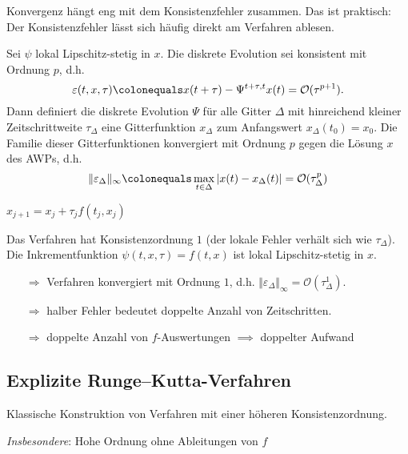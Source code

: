 Konvergenz hängt eng mit dem Konsistenzfehler zusammen. Das ist praktisch: Der Konsistenzfehler lässt sich häufig direkt am Verfahren ablesen.

\begin{satz}
	Sei $\psi$ lokal Lipschitz-stetig in $x$. Die diskrete Evolution sei konsistent mit Ordnung $p$, d.h.
	\begin{equation*}
		\varepsilon(t,x,\tau) \colonequals x(t+\tau)-\Psi^{t+\tau,t} x(t)=\mathcal{O} (\tau^{p+1}).
	\end{equation*}
	Dann definiert die diskrete Evolution $\Psi$ für alle Gitter $\Delta$ mit hinreichend kleiner Zeitschrittweite $\tau_{\Delta}$ eine Gitterfunktion $x_{\Delta}$ zum Anfangswert $x_\Delta(t_0) = x_0$.
	Die Familie dieser Gitterfunktionen konvergiert mit Ordnung $p$ gegen die Lösung $x$ des AWPs, d.h.
	\begin{equation*}
		\norm{\varepsilon_{\Delta}}_{\infty}
		\colonequals
		\max_{t \in \Delta} \vert x(t)-x_{\Delta} (t) \vert =\mathcal{O} (\tau_{\Delta}^p)
	\end{equation*}
\end{satz}

\begin{bsp}
	$x_{j+1}=x_j+\tau_j f (t_j,x_j)$
	
	Das Verfahren hat Konsistenzordnung $1$ (der lokale Fehler verhält sich wie $\tau_{\Delta}$). Die Inkrementfunktion $\psi(t,x,\tau) = f(t,x)$ ist lokal Lipschitz-stetig in $x$.
	\begin{itemize}[leftmargin=*]
		\item[$\Rightarrow$] Verfahren konvergiert mit Ordnung $1$, d.h. $\Vert \varepsilon_{\Delta} \Vert_{\infty}=\mathcal{O} (\tau_{\Delta}^1 )$.
		\item[$\Rightarrow$] halber Fehler bedeutet doppelte Anzahl von Zeitschritten.
		\item[$\Rightarrow$] doppelte Anzahl von $f$-Auswertungen $\implies$ doppelter Aufwand
	\end{itemize}
\end{bsp}


\subsection{Explizite Runge--Kutta-Verfahren}

Klassische Konstruktion von Verfahren mit einer höheren Konsistenzordnung.

\emph{Insbesondere}: Hohe Ordnung ohne Ableitungen von $f$

